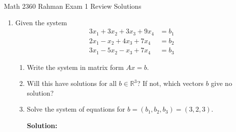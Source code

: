 \documentclass[14pt]{amsart}
\newcommand{\?}{\stackrel{?}{=}}
\newcommand{\R}{\mathbb{R}}
\begin{document}
\begin{flushleft}
{\sc \Large Math 2360 Rahman} \hfill Exam 1 Review Solutions
\bigskip
\end{flushleft}

\Large

\begin{enumerate}

\setlength\itemsep{1em}

\item  Given the system
%
\begin{equation*}
\begin{split}
3x_1 + 3x_2 + 3x_3 + 9x_4 &= b_1\\
2x_1 - x_2 + 4x_3 + 7x_4 &= b_2\\
3x_1 - 5x_2 - x_3 + 7 x_4 &= b_3
\end{split}
\end{equation*}


\begin{enumerate}

\item  Write the system in matrix form $Ax = b$.

\item  Will this have solutions for all $b \in \R^3$?  If not, which vectors $b$ give no solution?

\item  Solve the system of equations for $b = (b_1, b_2, b_3) = (3, 2, 3)$.

\textbf{Solution:  }  


\end{enumerate}
\end{enumerate}
\end{document}

